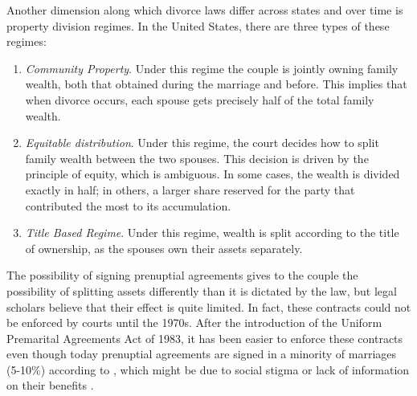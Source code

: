 \documentclass[12pt]{article}
\numberwithin{table}{section}
\begin{document}
Another dimension along which divorce laws differ across states and over time is property division regimes. In the United States, there are three types of these regimes:
\begin{enumerate}
\item \textit{Community Property}. Under this regime the couple is jointly owning family wealth, both that obtained during the marriage and before. This implies that when divorce occurs, each spouse gets precisely half of the total family wealth.
\item \textit{Equitable distribution}. Under this regime, the court decides how to split family wealth between the two spouses. This decision is driven by the principle of equity, which is ambiguous. In some cases, the wealth is divided exactly in half; in others, a larger share reserved for the party that contributed the most to its accumulation.
\item \textit{Title Based Regime}. Under this regime, wealth is split according to the title of ownership, as the spouses own their assets separately.
\end{enumerate}
The possibility of signing prenuptial agreements gives to the couple the possibility of splitting assets differently than it is dictated by the law, but legal scholars believe that their effect is quite limited. In fact, these contracts could not be enforced by courts until the 1970s. After the introduction of the Uniform Premarital Agreements Act of 1983, it has been easier to enforce these contracts even though today prenuptial agreements are signed in a minority of marriages (5-10\%) according to \cite{rainer2007}, which might be due to social stigma or lack of information on their benefits \citep{mahar2003}.\\
\end{document}
